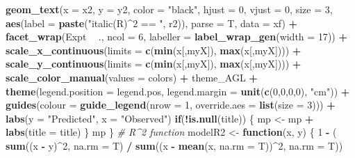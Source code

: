 \documentclass[
]{article}
\newenvironment{Shaded}{\begin{snugshade}}{\end{snugshade}}
\newcommand{\CommentTok}[1]{\textcolor[rgb]{0.56,0.35,0.01}{\textit{#1}}}
\newcommand{\ControlFlowTok}[1]{\textcolor[rgb]{0.13,0.29,0.53}{\textbf{#1}}}
\newcommand{\DataTypeTok}[1]{\textcolor[rgb]{0.13,0.29,0.53}{#1}}
\newcommand{\DecValTok}[1]{\textcolor[rgb]{0.00,0.00,0.81}{#1}}
\newcommand{\KeywordTok}[1]{\textcolor[rgb]{0.13,0.29,0.53}{\textbf{#1}}}
\newcommand{\NormalTok}[1]{#1}
\newcommand{\OperatorTok}[1]{\textcolor[rgb]{0.81,0.36,0.00}{\textbf{#1}}}
\newcommand{\StringTok}[1]{\textcolor[rgb]{0.31,0.60,0.02}{#1}}
\begin{document}
\begin{Shaded}
\begin{Highlighting}[]
{{{{{{{{{{\StringTok{    }\KeywordTok{geom_text}\NormalTok{(}\DataTypeTok{x =}\NormalTok{ x2, }\DataTypeTok{y =}\NormalTok{ y2, }\DataTypeTok{color =} \StringTok{"black"}\NormalTok{, }\DataTypeTok{hjust =} \DecValTok{0}\NormalTok{, }\DataTypeTok{vjust =} \DecValTok{0}\NormalTok{, }\DataTypeTok{size =} \DecValTok{3}\NormalTok{,}
              \KeywordTok{aes}\NormalTok{(}\DataTypeTok{label =} \KeywordTok{paste}\NormalTok{(}\StringTok{"italic(R)^2 == "}\NormalTok{, r2)), }\DataTypeTok{parse =}\NormalTok{ T, }\DataTypeTok{data =}\NormalTok{ xf) }\OperatorTok{+}
\StringTok{    }\KeywordTok{facet_wrap}\NormalTok{(Expt }\OperatorTok{~}\StringTok{ }\NormalTok{., }\DataTypeTok{ncol =} \DecValTok{6}\NormalTok{, }\DataTypeTok{labeller =} \KeywordTok{label_wrap_gen}\NormalTok{(}\DataTypeTok{width =} \DecValTok{17}\NormalTok{)) }\OperatorTok{+}\StringTok{ }
\StringTok{    }\KeywordTok{scale_x_continuous}\NormalTok{(}\DataTypeTok{limits =} \KeywordTok{c}\NormalTok{(}\KeywordTok{min}\NormalTok{(x[,myX]), }\KeywordTok{max}\NormalTok{(x[,myX]))) }\OperatorTok{+}
\StringTok{    }\KeywordTok{scale_y_continuous}\NormalTok{(}\DataTypeTok{limits =} \KeywordTok{c}\NormalTok{(}\KeywordTok{min}\NormalTok{(x[,myX]), }\KeywordTok{max}\NormalTok{(x[,myX]))) }\OperatorTok{+}
\StringTok{    }\KeywordTok{scale_color_manual}\NormalTok{(}\DataTypeTok{values =}\NormalTok{ colors) }\OperatorTok{+}
\StringTok{    }\NormalTok{theme_AGL }\OperatorTok{+}\StringTok{ }
\StringTok{    }\KeywordTok{theme}\NormalTok{(}\DataTypeTok{legend.position =}\NormalTok{ legend.pos, }\DataTypeTok{legend.margin =} \KeywordTok{unit}\NormalTok{(}\KeywordTok{c}\NormalTok{(}\DecValTok{0}\NormalTok{,}\DecValTok{0}\NormalTok{,}\DecValTok{0}\NormalTok{,}\DecValTok{0}\NormalTok{), }\StringTok{"cm"}\NormalTok{)) }\OperatorTok{+}
\StringTok{    }\KeywordTok{guides}\NormalTok{(}\DataTypeTok{colour =} \KeywordTok{guide_legend}\NormalTok{(}\DataTypeTok{nrow =} \DecValTok{1}\NormalTok{, }\DataTypeTok{override.aes =} \KeywordTok{list}\NormalTok{(}\DataTypeTok{size =} \DecValTok{3}\NormalTok{))) }\OperatorTok{+}
\StringTok{    }\KeywordTok{labs}\NormalTok{(}\DataTypeTok{y =} \StringTok{"Predicted"}\NormalTok{, }\DataTypeTok{x =} \StringTok{"Observed"}\NormalTok{)}
  \ControlFlowTok{if}\NormalTok{(}\OperatorTok{!}\KeywordTok{is.null}\NormalTok{(title)) \{ mp <-}\StringTok{ }\NormalTok{mp }\OperatorTok{+}\StringTok{ }\KeywordTok{labs}\NormalTok{(}\DataTypeTok{title =}\NormalTok{ title) \}}
\NormalTok{  mp}
\NormalTok{\}}
\CommentTok{# R^2 function}
\NormalTok{modelR2 <-}\StringTok{ }\ControlFlowTok{function}\NormalTok{(x, y) \{}
  \DecValTok{1} \OperatorTok{-}\StringTok{ }\NormalTok{( }\KeywordTok{sum}\NormalTok{((x }\OperatorTok{-}\StringTok{ }\NormalTok{y)}\OperatorTok{^}\DecValTok{2}\NormalTok{, }\DataTypeTok{na.rm =}\NormalTok{ T) }\OperatorTok{/}\StringTok{ }\KeywordTok{sum}\NormalTok{((x }\OperatorTok{-}\StringTok{ }\KeywordTok{mean}\NormalTok{(x, }\DataTypeTok{na.rm =}\NormalTok{ T))}\OperatorTok{^}\DecValTok{2}\NormalTok{, }\DataTypeTok{na.rm =}\NormalTok{ T))}
}}}}}}}}}}
\end{Highlighting}
\end{Shaded}
\end{document}
